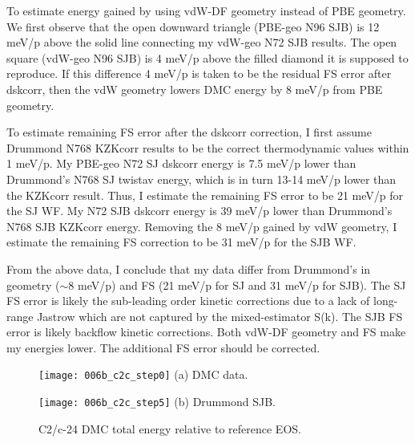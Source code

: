To estimate energy gained by using vdW-DF geometry instead of PBE geometry. We first observe that the open downward triangle (PBE-geo N96 SJB) is 12 meV/p above the solid line connecting my vdW-geo N72 SJB results. The open square (vdW-geo N96 SJB) is 4 meV/p above the filled diamond it is supposed to reproduce. If this difference 4 meV/p is taken to be the residual FS error after dskcorr, then the vdW geometry lowers DMC energy by 8 meV/p from PBE geometry. 

To estimate remaining FS error after the dskcorr correction, I first assume Drummond N768 KZKcorr results to be the correct thermodynamic values within 1 meV/p. My PBE-geo N72 SJ dskcorr energy is 7.5 meV/p lower than Drummond's N768 SJ twistav energy, which is in turn 13-14 meV/p lower than the KZKcorr result. Thus, I estimate the remaining FS error to be 21 meV/p for the SJ WF. My N72 SJB dskcorr energy is 39 meV/p lower than Drummond's N768 SJB KZKcorr energy. Removing the 8 meV/p gained by vdW geometry, I estimate the remaining FS correction to be 31 meV/p for the SJB WF.

From the above data, I conclude that my data differ from Drummond's in geometry ($\sim$8 meV/p) and FS (21 meV/p for SJ and 31 meV/p for SJB). The SJ FS error is likely the sub-leading order kinetic corrections due to a lack of long-range Jastrow which are not captured by the mixed-estimator S(k). The SJB FS error is likely backflow kinetic corrections. Both vdW-DF geometry and FS make my energies lower. The additional FS error should be corrected.

\begin{figure}[h]
\begin{minipage}{0.48\textwidth}
\texttt{[image: 006b\_c2c\_step0]}
(a) DMC data.%
\end{minipage}
\begin{minipage}{0.48\textwidth}
\texttt{[image: 006b\_c2c\_step5]}
(b) Drummond SJB. %
\end{minipage}
\caption{C2/c-24 DMC total energy relative to reference EOS.\label{fig:static-c2c-yang-drummond}}
\end{figure}

